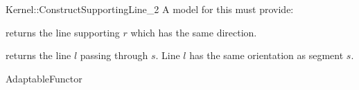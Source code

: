 \begin{ccRefFunctionObjectConcept}{Kernel::ConstructSupportingLine_2}
A model for this must provide:


       {returns the line supporting $r$ which has the same direction.}

       {returns the line $l$ passing through $s$. Line $l$  has the
        same orientation as segment $s$.}

\ccRefines
AdaptableFunctor

\ccSeeAlso
{} \\
\\

\end{ccRefFunctionObjectConcept}

